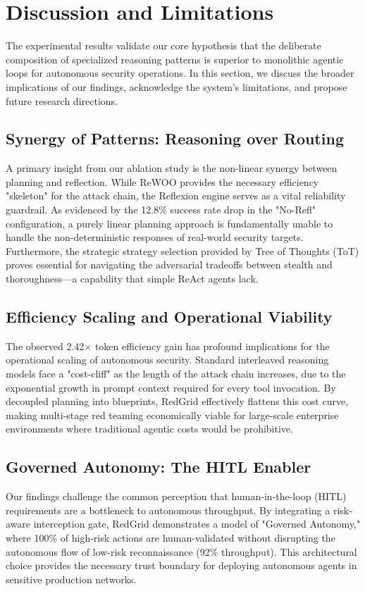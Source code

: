 \section{Discussion and Limitations}

The experimental results validate our core hypothesis that the deliberate composition of specialized reasoning patterns is superior to monolithic agentic loops for autonomous security operations. In this section, we discuss the broader implications of our findings, acknowledge the system's limitations, and propose future research directions.

\subsection{Synergy of Patterns: Reasoning over Routing}
A primary insight from our ablation study is the non-linear synergy between planning and reflection. While ReWOO provides the necessary efficiency "skeleton" for the attack chain, the Reflexion engine serves as a vital reliability guardrail. As evidenced by the 12.8\% success rate drop in the "No-Refl" configuration, a purely linear planning approach is fundamentally unable to handle the non-deterministic responses of real-world security targets. Furthermore, the strategic strategy selection provided by Tree of Thoughts (ToT) proves essential for navigating the adversarial tradeoffs between stealth and thoroughness—a capability that simple ReAct agents lack.

\subsection{Efficiency Scaling and Operational Viability}
The observed 2.42$\times$ token efficiency gain has profound implications for the operational scaling of autonomous security. Standard interleaved reasoning models face a "cost-cliff" as the length of the attack chain increases, due to the exponential growth in prompt context required for every tool invocation. By decoupled planning into blueprints, RedGrid effectively flattens this cost curve, making multi-stage red teaming economically viable for large-scale enterprise environments where traditional agentic costs would be prohibitive.

\subsection{Governed Autonomy: The HITL Enabler}
Our findings challenge the common perception that human-in-the-loop (HITL) requirements are a bottleneck to autonomous throughput. By integrating a risk-aware interception gate, RedGrid demonstrates a model of "Governed Autonomy," where 100\% of high-risk actions are human-validated without disrupting the autonomous flow of low-risk reconnaissance (92\% throughput). This architectural choice provides the necessary trust boundary for deploying autonomous agents in sensitive production networks.

